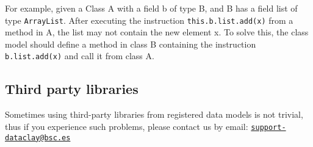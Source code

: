For example, given a Class A with a field b of type B, and B has a field list of type \texttt{ArrayList}. After executing the instruction \texttt{this.b.list.add(x)} from a method in A, the list may not contain the new element x. To solve this, the class model should define a method in class B containing the instruction \texttt{b.list.add(x)} and call it from class A.

\subsection{Third party libraries}

Sometimes using third-party libraries from registered data models is not trivial, thus if you experience such problems, please contact us by email: \texttt{\href{mailto:support-dataclay@bsc.es}{support-dataclay@bsc.es}}

\FEDERATION{

}

\FILTERING{

}

